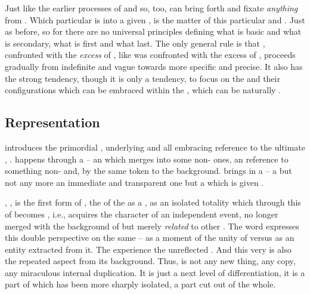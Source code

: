 \pa Just like the earlier processes of  and  so,
too,  can bring forth and fixate {\em anything} from
. Which particular  is  into a given
, is the matter of this particular  and
. Just as before, so for  there are no universal
principles defining what is basic and what is secondary, what is first and what
last. The only general rule is that , confronted with the {\em
  excess} of , like  was confronted with the
excess of , proceeds gradually from indefinite and vague towards more
specific and precise. It also has the strong tendency, though it is only a
tendency, to focus on the  and their configurations which can
be embraced within the \hoa, which can be naturally .


\subsection{Representation}\label{sub:represent}%
\pa {} introduces the primordial , underlying
and all embracing reference to the ultimate , .
 happens through a  -- an  which
merges into some non- ones, an  reference to something
non- and, by the same token to the  background.
 brings in a  -- a  but not any more
an immediate and transparent one but a  which is given .

\label{pa:refrepet} 
, , is the first form of ,
the  of the   as a 
, as an isolated totality which through this  of
 becomes , i.e., acquires the character of an
independent event, no longer merged with the background of  but
merely {\em related} to other . The word
 expresses this double perspective on the same -- as a
moment of the unity of  versus as an entity extracted from it.
The  experience  the unreflected
. And this very  is also  the
repeated aspect from its background. Thus, 
 is not any new thing, any copy, any miraculous internal
duplication.  It is just a next level of differentiation, it is a part of
 which has been more sharply isolated, a  part
{cut} out of the whole.



